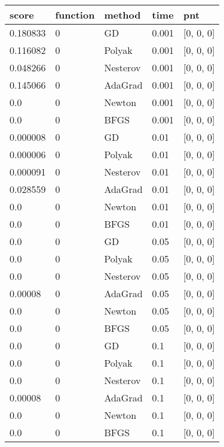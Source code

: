 \begin{tabular}{lllll}
\toprule
    score & function &   method &   time &              pnt \\
\midrule
 0.180833 &        0 &       GD &  0.001 &        [0, 0, 0] \\
 0.116082 &        0 &   Polyak &  0.001 &        [0, 0, 0] \\
 0.048266 &        0 & Nesterov &  0.001 &        [0, 0, 0] \\
 0.145066 &        0 &  AdaGrad &  0.001 &        [0, 0, 0] \\
      0.0 &        0 &   Newton &  0.001 &        [0, 0, 0] \\
      0.0 &        0 &     BFGS &  0.001 &        [0, 0, 0] \\
 0.000008 &        0 &       GD &   0.01 &        [0, 0, 0] \\
 0.000006 &        0 &   Polyak &   0.01 &        [0, 0, 0] \\
 0.000091 &        0 & Nesterov &   0.01 &        [0, 0, 0] \\
 0.028559 &        0 &  AdaGrad &   0.01 &        [0, 0, 0] \\
      0.0 &        0 &   Newton &   0.01 &        [0, 0, 0] \\
      0.0 &        0 &     BFGS &   0.01 &        [0, 0, 0] \\
      0.0 &        0 &       GD &   0.05 &        [0, 0, 0] \\
      0.0 &        0 &   Polyak &   0.05 &        [0, 0, 0] \\
      0.0 &        0 & Nesterov &   0.05 &        [0, 0, 0] \\
  0.00008 &        0 &  AdaGrad &   0.05 &        [0, 0, 0] \\
      0.0 &        0 &   Newton &   0.05 &        [0, 0, 0] \\
      0.0 &        0 &     BFGS &   0.05 &        [0, 0, 0] \\
      0.0 &        0 &       GD &    0.1 &        [0, 0, 0] \\
      0.0 &        0 &   Polyak &    0.1 &        [0, 0, 0] \\
      0.0 &        0 & Nesterov &    0.1 &        [0, 0, 0] \\
  0.00008 &        0 &  AdaGrad &    0.1 &        [0, 0, 0] \\
      0.0 &        0 &   Newton &    0.1 &        [0, 0, 0] \\
      0.0 &        0 &     BFGS &    0.1 &        [0, 0, 0] \\

\end{tabular}
